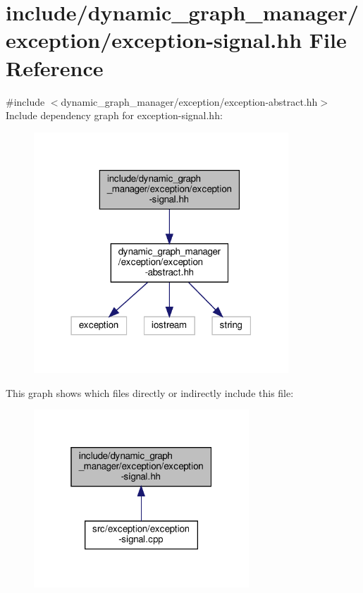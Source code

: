 \hypertarget{exception-signal_8hh}{}\section{include/dynamic\+\_\+graph\+\_\+manager/exception/exception-\/signal.hh File Reference}
\label{exception-signal_8hh}
{\ttfamily \#include $<$dynamic\+\_\+graph\+\_\+manager/exception/exception-\/abstract.\+hh$>$}\newline
Include dependency graph for exception-\/signal.hh\+:
\nopagebreak
\begin{figure}[H]
\begin{center}
\leavevmode
\includegraphics[width=271pt]{exception-signal_8hh__incl}
\end{center}
\end{figure}
This graph shows which files directly or indirectly include this file\+:
\nopagebreak
\begin{figure}[H]
\begin{center}
\leavevmode
\includegraphics[width=229pt]{exception-signal_8hh__dep__incl}
\end{center}
\end{figure}
